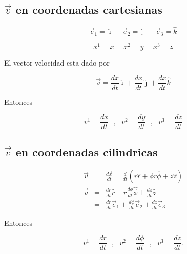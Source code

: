 \documentclass[12pt]{report}
\begin{document}
\subsection{$\vec{v}$ en coordenadas cartesianas}


\begin{equation}\nonumber
\vec{e}_1= \hat{\imath} \ \ \  \ \ \ \vec{e}_2= \hat{\jmath} \ \ \  \ \ \ \vec{e}_3= \hat{k}
\end{equation}

\begin{equation} \nonumber
x^1=x \ \ \  \ \ \ x^2=y \ \ \  \ \ \ x^3=z
\end{equation}


El vector velocidad esta dado por 

\begin{equation} \label{2.95}
\vec{v}=\frac{dx}{dt}\hat{\imath} + \frac{dx}{dt}\hat{\jmath} + \frac{dx}{dt} \hat{k}
\end{equation}

Entonces

\begin{equation} \label{2.96}
v^1= \frac{dx}{dt} \ \ \ , \ \ \ v^2=\frac{dy}{dt} \ \ \ , \ \ \ v^3=\frac{dz}{dt}
\end{equation}









\subsection{$\vec{v}$ en coordenadas cilindricas}

\begin{eqnarray} \nonumber
\vec{v}&=&\frac{d\vec{x}}{dt} = \frac{d}{dt} \left( r\hat{r} + \phi r \hat{\phi} + z \hat{z} \right) \\\nonumber
\vec{v} &=& \frac{dr}{dt} \hat{r} + r\frac{d\phi}{dt} \hat{\phi} + \frac{dz}{dt} \hat{z} \\ \label{2.97}
&=& \frac{dr}{dt} \vec{e}_1 + \frac{d\phi}{dt} \vec{e}_2 + \frac{dz}{dt} \vec{e}_3
\end{eqnarray}

Entonces

\begin{equation} \label{2.98}
v^1 = \frac{dr}{dt} \ \ \ , \ \ \  v^2 = \frac{d\phi}{dt} \ \ \ , \ \ \  v^3 = \frac{dz}{dt}.
\end{equation}
\end{document}
